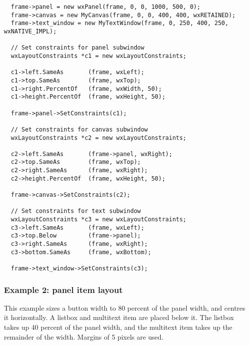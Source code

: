 \begin{verbatim}
  frame->panel = new wxPanel(frame, 0, 0, 1000, 500, 0);
  frame->canvas = new MyCanvas(frame, 0, 0, 400, 400, wxRETAINED);
  frame->text_window = new MyTextWindow(frame, 0, 250, 400, 250, wxNATIVE_IMPL);

  // Set constraints for panel subwindow
  wxLayoutConstraints *c1 = new wxLayoutConstraints;

  c1->left.SameAs       (frame, wxLeft);
  c1->top.SameAs        (frame, wxTop);
  c1->right.PercentOf   (frame, wxWidth, 50);
  c1->height.PercentOf  (frame, wxHeight, 50);

  frame->panel->SetConstraints(c1);

  // Set constraints for canvas subwindow
  wxLayoutConstraints *c2 = new wxLayoutConstraints;

  c2->left.SameAs       (frame->panel, wxRight);
  c2->top.SameAs        (frame, wxTop);
  c2->right.SameAs      (frame, wxRight);
  c2->height.PercentOf  (frame, wxHeight, 50);

  frame->canvas->SetConstraints(c2);

  // Set constraints for text subwindow
  wxLayoutConstraints *c3 = new wxLayoutConstraints;
  c3->left.SameAs       (frame, wxLeft);
  c3->top.Below         (frame->panel);
  c3->right.SameAs      (frame, wxRight);
  c3->bottom.SameAs     (frame, wxBottom);

  frame->text_window->SetConstraints(c3);
\end{verbatim}

\subsubsection{Example 2: panel item layout}

This example sizes a button width to 80 percent of the panel width, and centres
it horizontally. A listbox and multitext item are placed below it. The listbox
takes up 40 percent of the panel width, and the multitext item takes up
the remainder of the width. Margins of 5 pixels are used.

